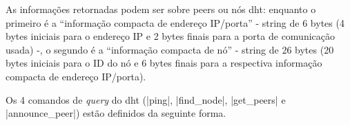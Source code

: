 As informações retornadas podem ser sobre \glspl*{peer} ou nós \gls*{dht}: enquanto o
primeiro é a \enquote{informação compacta de endereço IP/porta} - string de 6 bytes (4
bytes iniciais para o endereço IP e 2 bytes finais para a porta de comunicação usada)
-, o segundo é a \enquote{informação compacta de nó} - string de 26 bytes (20 bytes
iniciais para o ID do nó e 6 bytes finais para a respectiva informação compacta de
endereço IP/porta).

Os 4 comandos de \emph{query} do \gls*{dht} (\bverb|ping|, \bverb|find_node|,
\bverb|get_peers| e \bverb|announce_peer|) estão definidos da seguinte forma.








